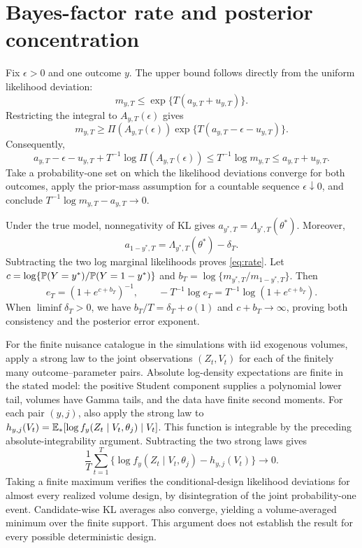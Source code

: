 \section{Bayes-factor rate and posterior concentration}
\label{app:rate}
Fix $\epsilon>0$ and one outcome $y$. The upper bound follows directly from the uniform likelihood deviation:
\[
 m_{y,T}\leq\exp\{T(a_{y,T}+u_{y,T})\}.
\]
Restricting the integral to $A_{y,T}(\epsilon)$ gives
\[
 m_{y,T}\geq\Pi(A_{y,T}(\epsilon))
 \exp\{T(a_{y,T}-\epsilon-u_{y,T})\}.
\]
Consequently,
\begin{equation}
 a_{y,T}-\epsilon-u_{y,T}+T^{-1}\log\Pi(A_{y,T}(\epsilon))
 \leq T^{-1}\log m_{y,T}\leq a_{y,T}+u_{y,T}.
 \label{eq:laplace-bounds}
\end{equation}
Take a probability-one set on which the likelihood deviations converge for both outcomes, apply the prior-mass assumption for a countable sequence $\epsilon\downarrow0$, and conclude
$T^{-1}\log m_{y,T}-a_{y,T}\to0$.

Under the true model, nonnegativity of KL gives
$a_{y^*,T}=\Lambda_{y^*,T}(\theta^*)$. Moreover,
\[
 a_{1-y^*,T}=\Lambda_{y^*,T}(\theta^*)-\delta_T.
\]
Subtracting the two log marginal likelihoods proves \eqref{eq:rate}. Let $c=\log\{\mathbb P(Y=y^*)/\mathbb P(Y=1-y^*)\}$ and
$b_T=\log\{m_{y^*,T}/m_{1-y^*,T}\}$. Then
\[
 e_T=(1+e^{c+b_T})^{-1},\qquad
 -T^{-1}\log e_T=T^{-1}\log(1+e^{c+b_T}).
\]
When $\liminf\delta_T>0$, we have $b_T/T=\delta_T+o(1)$ and $c+b_T\to\infty$, proving both consistency and the posterior error exponent.

For the finite nuisance catalogue in the simulations with iid exogenous volumes, apply a strong law to the joint observations $(Z_t,V_t)$ for each of the finitely many outcome--parameter pairs. Absolute log-density expectations are finite in the stated model: the positive Student component supplies a polynomial lower tail, volumes have Gamma tails, and the data have finite second moments. For each pair $(y,j)$, also apply the strong law to $h_{y,j}(V_t)=\mathbb E_*[\log f_y(Z_t\mid V_t,\theta_j)\mid V_t]$. This function is integrable by the preceding absolute-integrability argument. Subtracting the two strong laws gives
\[
 \frac1T\sum_{t=1}^T\{\log f_y(Z_t\mid V_t,\theta_j)-h_{y,j}(V_t)\}\to0.
\]
Taking a finite maximum verifies the conditional-design likelihood deviations for almost every realized volume design, by disintegration of the joint probability-one event. Candidate-wise KL averages also converge, yielding a volume-averaged minimum over the finite support. This argument does not establish the result for every possible deterministic design.

